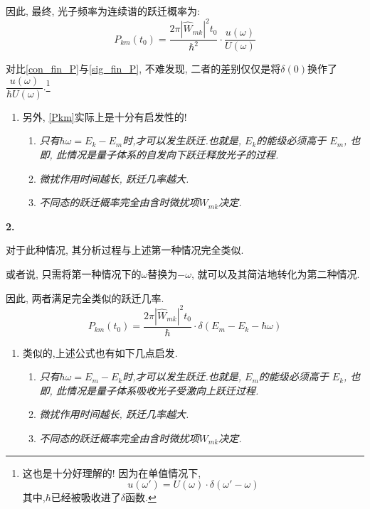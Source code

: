 \documentclass[a4paper, 11pt]{article}
\begin{document}
\begin{spacing}{1.2}
        因此, 最终, 光子频率为连续谱的跃迁概率为:    
        \begin{equation}
          \label{con_fin_P}
          P_{km}(t_0) = \dfrac{2\pi|\hat{W}_{mk}|^2t_0}{\hbar^2}\cdot\frac{u(\omega)}{U(\omega)}
        \end{equation}
        
        对比\eqref{con_fin_P}与\eqref{sig_fin_P}, 不难发现, 二者的差别仅仅是将$\delta(0)$换作了
        $\dfrac{u(\omega)}{\hbar{}U(\omega)}$.\footnote{这也是十分好理解的! 因为在单值情况下, 
        $$u(\omega') = U(\omega)\cdot\delta(\omega'-\omega)$$  其中,$\hbar$已经被吸收进了$\delta$函数.}

        \begin{enumerate}[]
          \item 另外, \eqref{Pkm}实际上是十分有启发性的!
          \begin{enumerate}[--]
                      
            \item\emph{只有$\hbar\omega = E_k-E_m$时,才可以发生跃迁.也就是, $E_k$的能级必须高于
                  $E_m$, 也即, 此情况是量子体系的自发向下跃迁释放光子的过程.}
            \item \emph{微扰作用时间越长, 跃迁几率越大.}
            \item \emph{不同态的跃迁概率完全由含时微扰项$W_{mk}$决定.}
          \end{enumerate}
        \end{enumerate}

        \textbf{2.}  {}
        \label{sec_transition_from}
 
        对于此种情况, 其分析过程与上述第一种情况完全类似. 

        或者说, 只需将第一种情况下的$\omega$替换为$-\omega$, 就可以及其简洁地转化为第二种情况.

        因此, 两者满足完全类似的跃迁几率.
        \begin{equation}
          \label{sec_tansition_equation}
          P_{km}(t_0) = \frac{2\pi|\hat{W}_{mk}|^2t_0}{\hbar}
          \cdot\delta(E_m-E_k-\hbar\omega) 
        \end{equation}
        \begin{enumerate}[]
          \item 类似的,上述公式也有如下几点启发.
          \begin{enumerate}[--]
            \item \emph{只有$\hbar\omega = E_m-E_k$时,才可以发生跃迁.也就是, $E_m$的能级必须高于
                  $E_k$, 也即, 此情况是量子体系吸收光子受激向上跃迁过程.}
            \item \emph{微扰作用时间越长, 跃迁几率越大.}
            \item \emph{不同态的跃迁概率完全由含时微扰项$W_{mk}$决定.}
          \end{enumerate}
        \end{enumerate}


\end{spacing}
\end{document}
